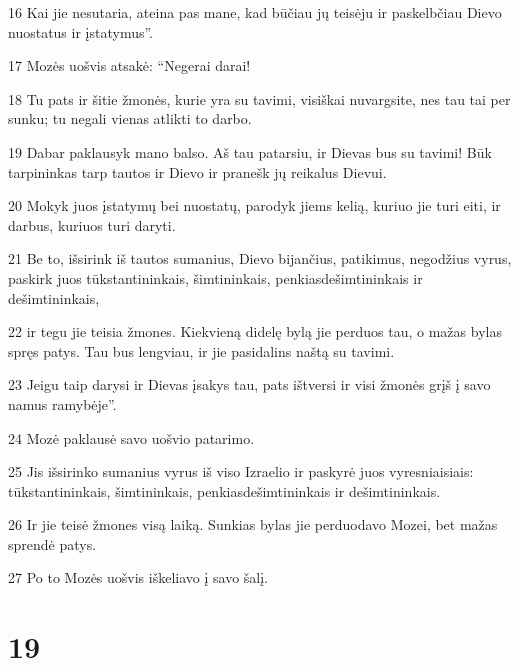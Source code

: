 \par 16 Kai jie nesutaria, ateina pas mane, kad būčiau jų teisėju ir paskelbčiau Dievo nuostatus ir įstatymus”. 
\par 17 Mozės uošvis atsakė: “Negerai darai! 
\par 18 Tu pats ir šitie žmonės, kurie yra su tavimi, visiškai nuvargsite, nes tau tai per sunku; tu negali vienas atlikti to darbo. 
\par 19 Dabar paklausyk mano balso. Aš tau patarsiu, ir Dievas bus su tavimi! Būk tarpininkas tarp tautos ir Dievo ir pranešk jų reikalus Dievui. 
\par 20 Mokyk juos įstatymų bei nuostatų, parodyk jiems kelią, kuriuo jie turi eiti, ir darbus, kuriuos turi daryti. 
\par 21 Be to, išsirink iš tautos sumanius, Dievo bijančius, patikimus, negodžius vyrus, paskirk juos tūkstantininkais, šimtininkais, penkiasdešimtininkais ir dešimtininkais, 
\par 22 ir tegu jie teisia žmones. Kiekvieną didelę bylą jie perduos tau, o mažas bylas spręs patys. Tau bus lengviau, ir jie pasidalins naštą su tavimi. 
\par 23 Jeigu taip darysi ir Dievas įsakys tau, pats ištversi ir visi žmonės grįš į savo namus ramybėje”. 
\par 24 Mozė paklausė savo uošvio patarimo. 
\par 25 Jis išsirinko sumanius vyrus iš viso Izraelio ir paskyrė juos vyresniaisiais: tūkstantininkais, šimtininkais, penkiasdešimtininkais ir dešimtininkais. 
\par 26 Ir jie teisė žmones visą laiką. Sunkias bylas jie perduodavo Mozei, bet mažas sprendė patys. 
\par 27 Po to Mozės uošvis iškeliavo į savo šalį.



\chapter{19}

